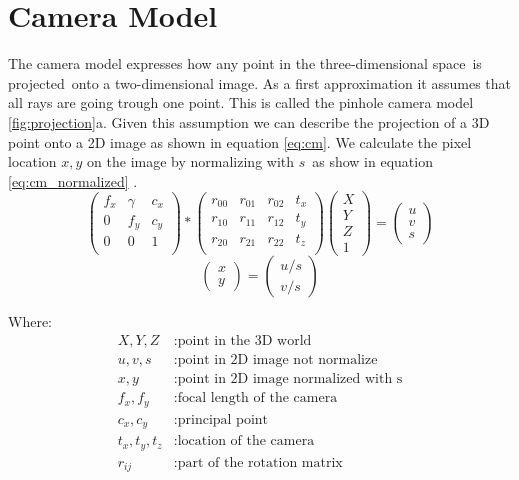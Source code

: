 \documentclass[11pt,a4paper,titlepage,oneside]{report}
\begin{document}
\section{Camera Model}

The camera model expresses how any point in the three-dimensional space is projected onto a two-dimensional image. As a first approximation it assumes that all rays are going trough one point. This is called the pinhole camera model \ref{fig:projection}a. Given this assumption we can describe the projection of a 3D point onto a 2D image as shown in equation \ref{eq:cm}. We calculate the pixel location $x,y$ on the image by normalizing with $s$ as show in equation \ref{eq:cm_normalized} \cite{rvc}.
\begin{equation}\label{eq:cm}
  \begin{pmatrix}
		f_x & \gamma & c_x \\
		0 & f_y & c_y \\
		0 & 0 & 1 \\
	\end{pmatrix}*
	\begin{pmatrix}
		r_{00} & r_{01} & r_{02} & t_x \\
		r_{10} & r_{11} & r_{12} & t_y \\
		r_{20} & r_{21} & r_{22} & t_z \\
	\end{pmatrix}
	\begin{pmatrix}
		X \\
		Y \\
		Z \\
		1
	\end{pmatrix}=
	\begin{pmatrix}
		u \\
		v \\
		s
  \end{pmatrix}
\end{equation}
\begin{equation}\label{eq:cm_normalized}
	\begin{pmatrix}
		x \\
		y
	\end{pmatrix}=
	\begin{pmatrix}
		u/s \\
		v/s 
  \end{pmatrix}
\end{equation}

Where:
\begin{align*}
  X,Y,Z			&: \text{point in the 3D world}\\
	u,v,s	   	&: \text{point in 2D image not normalize}\\
	x,y				&: \text{point in 2D image normalized with s}\\
	f_x,f_y  	&: \text{focal length of the camera}\\
  c_x,c_y  	&: \text{principal point}\\
  t_x,t_y,t_z	&: \text{location of the camera}\\
  r_{ij}	&: \text{part of the rotation matrix}
\end{align*}
\end{document}
